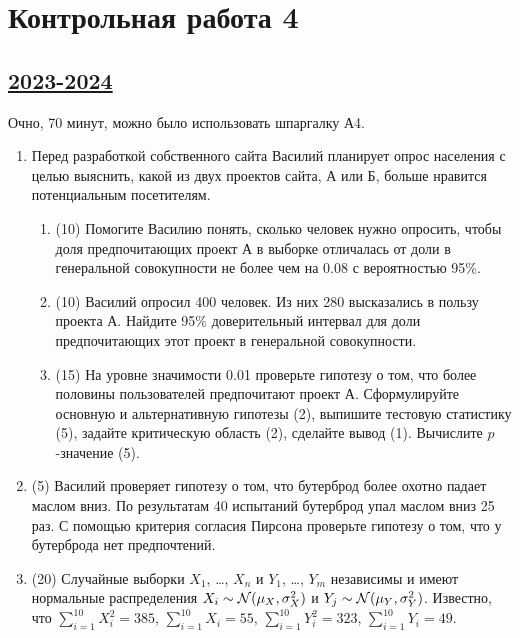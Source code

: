 
\newpage
\thispagestyle{empty}
\section{Контрольная работа 4}


\subsection[2023-2024]{\hyperref[sec:sol_kr_04_2023_2024]{2023-2024}}
\label{sec:kr_04_2023_2024}

Очно, 70 минут, можно было использовать шпаргалку А4.


\begin{enumerate}
\item Перед разработкой собственного сайта Василий планирует опрос населения с целью выяснить, 
какой из двух проектов сайта, А или Б, больше нравится потенциальным посетителям.
\begin{enumerate}
\item   (10) Помогите Василию понять, сколько человек нужно опросить, 
чтобы доля предпочитающих проект А в выборке отличалась от доли в генеральной совокупности 
не более чем на $0.08$ с вероятностью 95\%.
\item   (10) Василий опросил 400 человек. Из них 280 высказались в пользу проекта А.
Найдите 95\% доверительный интервал для доли предпочитающих этот проект в генеральной совокупности.
\item   (15) На уровне значимости 0.01 проверьте гипотезу о том, что более половины пользователей предпочитают проект А.
Сформулируйте основную и альтернативную гипотезы (2), выпишите тестовую статистику (5), задайте
критическую область (2), сделайте вывод (1). 
Вычислите $p$-значение (5).
\end{enumerate}

\item (5) Василий проверяет гипотезу о том, что бутерброд более охотно падает маслом вниз. 
По результатам 40 испытаний бутерброд упал маслом вниз 25 раз. 
С помощью критерия согласия Пирсона проверьте гипотезу о том, что у бутерброда нет предпочтений.

\item  (20) Случайные выборки $X_1$, \ldots, $X_n$ и $Y_1$, \ldots, $Y_m$ независимы
и имеют нормальные распределения $X_i \sim \mathcal{N}(\mu_X, \sigma_X^2)$ и $Y_j \sim \mathcal{N}(\mu_Y, \sigma_Y^2)$.
Известно, что $\sum_{i=1}^{10} X_i^2=385$, $\sum_{i=1}^{10} X_i=55$, $\sum_{i=1}^{10} Y_i^2=323$, $\sum_{i=1}^{10} Y_i=49$.


\end{enumerate}
